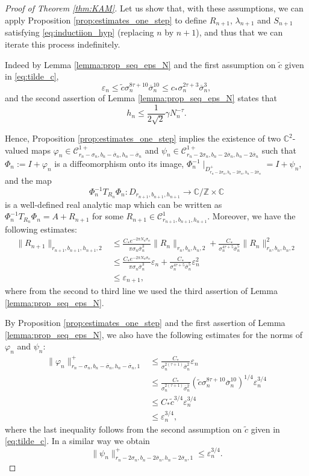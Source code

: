 \documentclass[10pt]{article}
\newcommand{\Z}{\mathbb{Z}}
\newcommand{\C}{\mathbb{C}}
\newcommand{\Domain}[3]{D_{#1, #2, #3}}
\newcommand{\DomainP}[3]{D_{#1, #2, #3}^+}
\begin{document}
\begin{proof}[Proof of Theorem \ref{thm:KAM}]
Let us show that, with these assumptions, we can apply Proposition \ref{prop:estimates_one_step} to define $R_{n + 1}$, $\lambda_{n + 1}$ and $S_{n + 1}$  satisfying \eqref{eq:inductiion_hyp} (replacing $n$ by $n + 1$), and thus that we can iterate this process indefinitely.

Indeed by Lemma \ref{lemma:prop_seq_eps_N} and the first assumption on $\tilde c$ given in \eqref{eq:tilde_c}, 
\[
\varepsilon_n\leq \tilde c\sigma_n^{8\tau+10}\overline\sigma_n^{10}\leq 
c_\ast\sigma_n^{2\tau+3}\overline\sigma_n^{3},
\]
and the second assertion of Lemma \ref{lemma:prop_seq_eps_N} states that
\[
h_n\leq\frac{1}{2\sqrt 2}\gamma N_n^{-\tau}.
\]

Hence, Proposition \ref{prop:estimates_one_step} implies the existence of two $\C^2$-valued maps $\varphi_n\in\mathscr C^{1+}_{r_n-\sigma_n,b_n-\overline\sigma_n,h_n-\overline\sigma_n}$ and $\psi_n\in\mathscr C^{1+}_{r_n-2\sigma_n,b_n-2\overline\sigma_n,h_n-2\overline\sigma_n}$ such that
$\Phi_n := I+\varphi_n$ is a diffeomorphism onto its image, $\Phi^{-1}_n\mid_{\DomainP{r_n-2\sigma_n}{b_n-2\overline\sigma_n}{h_n-2\overline\sigma_n}} = I + \psi_n$, and the map 
\[
\Phi^{-1}_nT_{R_n}\Phi_n :\Domain{r_{n + 1}}{b_{n + 1}}{h_{n + 1}}  \to\C/\Z\times \C
\]
is a well-defined real analytic map which can be written as
$\Phi^{-1}_nT_{R_n}\Phi_n = A+R_{n+1}$ for some $R_{n+1}\in\mathscr C^1_{r_{n+1},b_{n+1},h_{n+1}}$.
Moreover, we have the following estimates:
\begin{align*}
\|R_{n+1}\|_{r_{n+1},b_{n+1},h_{n+1},2} 
&\leq
\frac{C_\ast e^{-2\pi N_n\sigma_n}}{\pi\sigma_n\overline \sigma_n^3}\|R_n\|_{r_n,b_n,h_n,2}+\frac{C_\ast}{\sigma_n^{4\tau+5}\overline\sigma_n^5}\|R_n\|_{r_n,b_n,h_n,2}^2\\
&\leq
\frac{C_\ast e^{-2\pi N_n\sigma_n}}{\pi\sigma_n\overline \sigma_n^3}\varepsilon_n+\frac{C_\ast}{\sigma_n^{4\tau+5}\overline\sigma_n^5}\varepsilon_n^2\\
&\leq \varepsilon_{n+1},
\end{align*}
where from the second to third line we used the third assertion of Lemma \ref{lemma:prop_seq_eps_N}. 

By Proposition \ref{prop:estimates_one_step} and the first assertion of Lemma \ref{lemma:prop_seq_eps_N}, we also have the following estimates for the norms of $\varphi_n$ and $\psi_n$:
\begin{align*}
\|\varphi_{n}\|^+_{r_{n}-\sigma_n,b_{n}-\overline\sigma_n,h_{n}-\overline\sigma_n,1} 
&\leq
\frac{C_\ast}{\sigma_n^{2(\tau+1)}\overline\sigma_n^2}\varepsilon_n\\
&\leq
\frac{C_\ast}{\sigma_n^{2(\tau+1)}\overline\sigma_n^2}(\tilde c\sigma_n^{8\tau+10}\overline\sigma_n^{10})^{1/4}
\varepsilon_n^{3/4}\\
&\leq
C_\ast\tilde c^{3/4}
\varepsilon_n^{3/4}\\
&\leq \varepsilon_{n}^{3/4},
\end{align*}
where the last inequality follows from the second assumption on $\tilde c$ given in \eqref{eq:tilde_c}. 
In a similar way we obtain
\[
\|\psi_{n}\|^+_{r_{n}-2\sigma_n,b_{n}-2\overline\sigma_n,h_{n}-2\overline\sigma_n,1} \leq \varepsilon_n^{3/4}.
\]


\end{proof}
\end{document}
